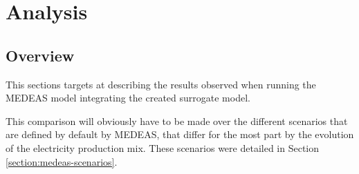 \section{Analysis}

\subsection{Overview}

This sections targets at describing the results observed when running the MEDEAS model integrating the created surrogate model.

This comparison will obviously have to be made over the different scenarios that are defined by default by MEDEAS, that differ for the most part by the evolution of the electricity production mix. These scenarios were detailed in Section \ref{section:medeas-scenarios}.

\subsection{}